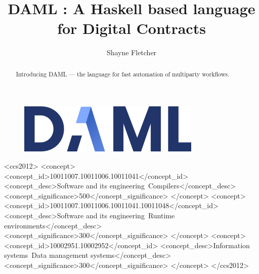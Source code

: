 \documentclass[acmsmall]{acmart}
\begin{document}
\title{DAML : A Haskell based language for Digital Contracts}

%
\author{Shayne Fletcher}

\renewcommand{\shortauthors}{Shayne Fletcher}

\begin{figure}[H]
\centering
\includegraphics{img/DAML_330x89.png}
\end{figure}

\begin{abstract}
Introducing DAML --- the language for fast automation of multiparty workflows.
\end{abstract}

%
%
\begin{CCSXML}
<ccs2012>
<concept>
<concept_id>10011007.10011006.10011041</concept_id>
<concept_desc>Software and its engineering~Compilers</concept_desc>
<concept_significance>500</concept_significance>
</concept>
<concept>
<concept_id>10011007.10011006.10011041.10011048</concept_id>
<concept_desc>Software and its engineering~Runtime environments</concept_desc>
<concept_significance>300</concept_significance>
</concept>
<concept>
<concept_id>10002951.10002952</concept_id>
<concept_desc>Information systems~Data management systems</concept_desc>
<concept_significance>300</concept_significance>
</concept>
</ccs2012>
\end{CCSXML}

\end{document}
